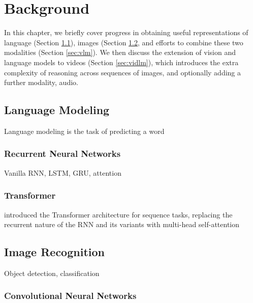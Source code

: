 
\chapter{Background}
\label{chap:bg}

In this chapter, we briefly cover progress in obtaining useful representations
of language (Section \ref{sec:lm}), images (Section \ref{sec:imrec}, and
efforts to combine these two modalities (Section \ref{sec:vlm}). We then
discuss the extension of vision and language models to videos (Section
\ref{sec:vidlm}), which introduces the extra complexity of reasoning across
sequences of images, and optionally adding a further modality, audio. 

\section{Language Modeling}
\label{sec:lm}

Language modeling is the task of predicting a word 

\subsection{Recurrent Neural Networks}
\label{ssec:rnn}

Vanilla RNN, LSTM, GRU, attention
	
\subsection{Transformer}
\label{ssec:transformer}

\cite{vaswani2017attention} introduced the Transformer architecture for sequence tasks, replacing the recurrent nature of the RNN and its variants with multi-head self-attention

\section{Image Recognition}
\label{sec:imrec}

Object detection, classification

\subsection{Convolutional Neural Networks}
\label{ssec:cnn}


